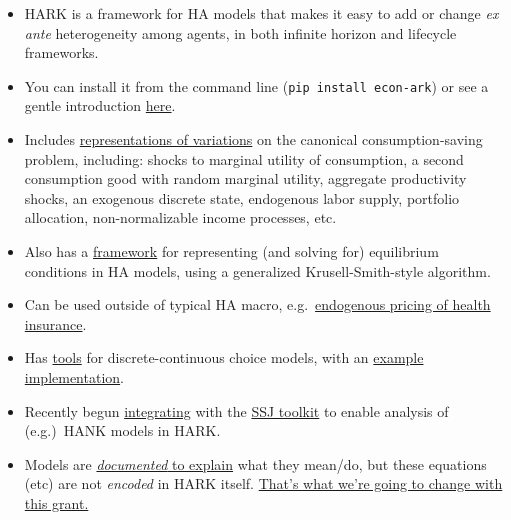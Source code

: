 \documentclass[12pt,pdftex,letterpaper]{article}
\begin{document}
\begin{itemize} 
	\item HARK is a framework for HA models that makes it easy to add or change \textit{ex ante} heterogeneity among agents, in both infinite horizon and lifecycle frameworks.
	
	\item You can install it from the command line (\texttt{pip install econ-ark}) or see a gentle introduction \href{https://econ-ark.org/materials/gentle-intro-to-hark/}{here}.
	
	\item Includes \href{https://docs.econ-ark.org/Documentation/reference/index.html}{representations of variations} on the canonical consumption-saving problem, including: shocks to marginal utility of consumption, a second consumption good with random marginal utility, aggregate productivity shocks, an exogenous discrete state, endogenous labor supply, portfolio allocation, non-normalizable income processes, etc.
	
	\item Also has a \href{https://docs.econ-ark.org/Documentation/reference/tools/core.html#HARK.core.Market}{framework} for representing (and solving for) equilibrium conditions in HA models, using a generalized Krusell-Smith-style algorithm.
	
	\item Can be used outside of typical HA macro, e.g.\ \href{http://www.mnwhite.org/DynInsSelPaper.pdf}{endogenous pricing of health insurance}.
	
	\item Has \href{https://github.com/econ-ark/HARK/blob/master/HARK/dcegm.py}{tools} for discrete-continuous choice models, with an \href{https://econ-ark.org/materials/endogenousretirement/}{example implementation}.
	
	\item Recently begun \href{https://docs.econ-ark.org/examples/ConsNewKeynesianModel/SSJ_example.html}{integrating} with the \href{https://github.com/shade-econ/sequence-jacobian}{SSJ toolkit} to enable analysis of (e.g.)\ HANK models in HARK.
	
	\item Models are \href{https://docs.econ-ark.org/Documentation/reference/ConsumptionSaving/ConsRiskyAssetModel.html#HARK.ConsumptionSaving.ConsRiskyAssetModel.IndShockRiskyAssetConsumerType}{\textit{documented} to explain} what they mean/do, but these equations (etc) are not \textit{encoded} in HARK itself. \underline{That's what we're going to change with this grant.}
\end{itemize}
\end{document}
